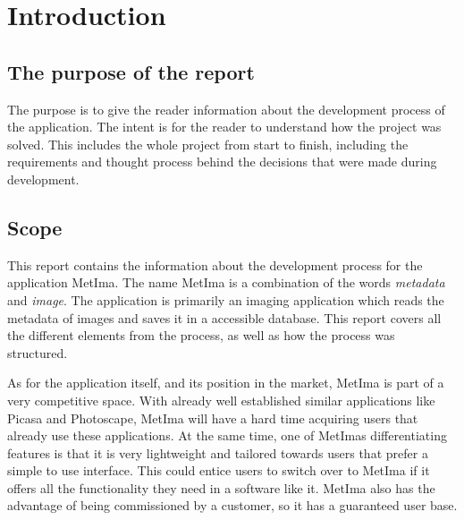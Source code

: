 \section{Introduction}

\subsection{The purpose of the report}
The purpose is to give the reader information about the development process of the application. The intent is for the reader to understand how the project was solved. This includes the whole project from start to finish, including the requirements and thought process behind the decisions that were made during development.

\subsection{Scope}
This report contains the information about the development process for the application MetIma. The name MetIma is a combination of the words \textit{metadata} and \textit{image}. The application is primarily an imaging application which reads the metadata of images and saves it in a accessible database. This report covers all the different elements from the process, as well as how the process was structured.

As for the application itself, and its position in the market, MetIma is part of a very competitive space. With already well established similar applications like Picasa and Photoscape, MetIma will have a hard time acquiring users that already use these applications. At the same time, one of MetImas differentiating features is that it is very lightweight and tailored towards users that prefer a simple to use interface. This could entice users to switch over to MetIma if it offers all the functionality they need in a software like it. MetIma also has the advantage of being commissioned by a customer, so it has a guaranteed user base.

\newpage

